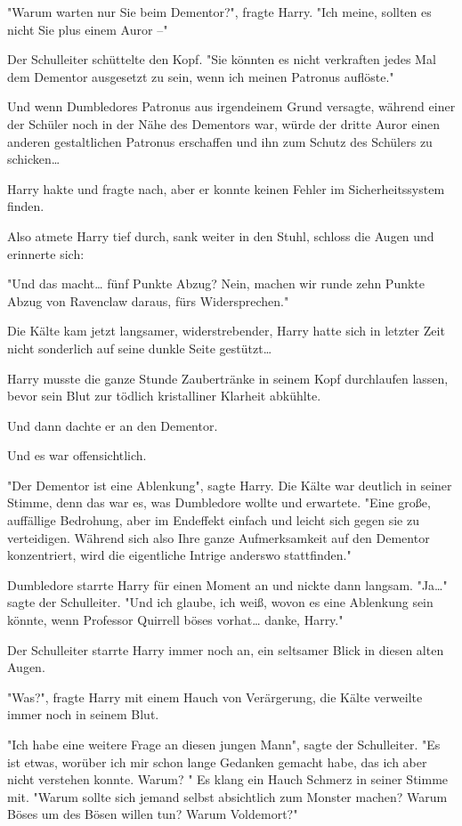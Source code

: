 {"Warum warten nur Sie beim Dementor?", fragte Harry. "Ich meine, sollten es nicht Sie plus einem Auror --"

Der Schulleiter schüttelte den Kopf. "Sie könnten es nicht verkraften jedes Mal dem Dementor ausgesetzt zu sein, wenn ich meinen Patronus auflöste."

Und wenn Dumbledores Patronus aus irgendeinem Grund versagte, während einer der Schüler noch in der Nähe des Dementors war, würde der dritte Auror einen anderen gestaltlichen Patronus erschaffen und ihn zum Schutz des Schülers zu schicken…

Harry hakte und fragte nach, aber er konnte keinen Fehler im Sicherheitssystem finden.

Also atmete Harry tief durch, sank weiter in den Stuhl, schloss die Augen und erinnerte sich:

"Und das macht… fünf Punkte Abzug? Nein, machen wir runde zehn Punkte Abzug von Ravenclaw daraus, fürs Widersprechen."

Die Kälte kam jetzt langsamer, widerstrebender, Harry hatte sich in letzter Zeit nicht sonderlich auf seine dunkle Seite gestützt…

Harry musste die ganze Stunde Zaubertränke in seinem Kopf durchlaufen lassen, bevor sein Blut zur tödlich kristalliner Klarheit abkühlte.

Und dann dachte er an den Dementor.

Und es war offensichtlich.

"Der Dementor ist eine Ablenkung", sagte Harry. Die Kälte war deutlich in seiner Stimme, denn das war es, was Dumbledore wollte und erwartete. "Eine große, auffällige Bedrohung, aber im Endeffekt einfach und leicht sich gegen sie zu verteidigen. Während sich also Ihre ganze Aufmerksamkeit auf den Dementor konzentriert, wird die eigentliche Intrige anderswo stattfinden."

Dumbledore starrte Harry für einen Moment an und nickte dann langsam. "Ja…" sagte der Schulleiter. "Und ich glaube, ich weiß, wovon es eine Ablenkung sein könnte, wenn Professor Quirrell böses vorhat… danke, Harry."

Der Schulleiter starrte Harry immer noch an, ein seltsamer Blick in diesen alten Augen.

"Was?", fragte Harry mit einem Hauch von Verärgerung, die Kälte verweilte immer noch in seinem Blut.

"Ich habe eine weitere Frage an diesen jungen Mann", sagte der Schulleiter. "Es ist etwas, worüber ich mir schon lange Gedanken gemacht habe, das ich aber nicht verstehen konnte. Warum? " Es klang ein Hauch Schmerz in seiner Stimme mit. "Warum sollte sich jemand selbst absichtlich zum Monster machen? Warum Böses um des Bösen willen tun? Warum Voldemort?"

}
